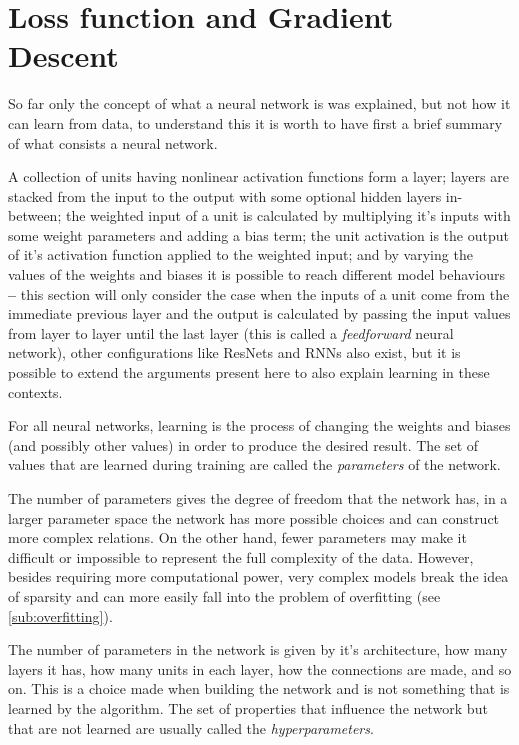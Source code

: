 \section{Loss function and Gradient Descent} \label{sec:loss_&_gradient_descent}
So far only the concept of what a neural network is was explained, but not how it can learn from data, to understand this it is worth to have first a brief summary of what consists a neural network.

A collection of units having nonlinear activation functions form a layer; layers are stacked from the input to the output with some optional hidden layers in-between; the weighted input of a unit is calculated by multiplying it's inputs with some weight parameters and adding a bias term; the unit activation is the output of it's activation function applied to the weighted input; and by varying the values of the weights and biases it is possible to reach different model behaviours \textbf{--} this section will only consider the case when the inputs of a unit come from the immediate previous layer and the output is calculated by passing the input values from layer to layer until the last layer (this is called a \textit{feedforward} neural network), other configurations like \acp{ResNet} \cite{resnet2015} and \acp{RNN} also exist, but it is possible to extend the arguments present here to also explain learning in these contexts.

For all neural networks, learning is the process of changing the weights and biases (and possibly other values) in order to produce the desired result. The set of values that are learned during training are called the \textit{parameters} of the network.

The number of parameters gives the degree of freedom that the network has, in a larger parameter space the network has more possible choices and can construct more complex relations. On the other hand, fewer parameters may make it difficult or impossible to represent the full complexity of the data. However, besides requiring more computational power, very complex models break the idea of sparsity and can more easily fall into the problem of overfitting (see \autoref{sub:overfitting}).

The number of parameters in the network is given by it's architecture, how many layers it has, how many units in each layer, how the connections are made, and so on. This is a choice made when building the network and is not something that is learned by the algorithm. The set of properties that influence the network but that are not learned are usually called the \textit{hyperparameters}. 

